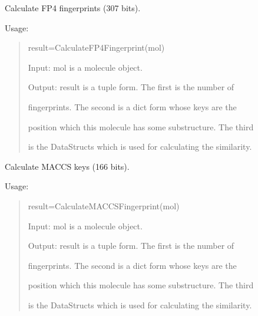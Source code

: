 \documentclass[letterpaper,10pt,english]{sphinxmanual}
\begin{document}
\begin{fulllineitems}
\label{reference/fingerprint:fingerprint.CalculateFP4Fingerprint}
Calculate FP4 fingerprints (307 bits).

Usage:
\begin{quote}

result=CalculateFP4Fingerprint(mol)

Input: mol is a molecule object.

Output: result is a tuple form. The first is the number of

fingerprints. The second is a dict form whose keys are the

position which this molecule has some substructure. The third

is the DataStructs which is used for calculating the similarity.
\end{quote}

\end{fulllineitems}


\begin{fulllineitems}
\label{reference/fingerprint:fingerprint.CalculateGhoseCrippenFingerprint}
\end{fulllineitems}


\begin{fulllineitems}
\label{reference/fingerprint:fingerprint.CalculateMACCSFingerprint}
Calculate MACCS keys (166 bits).

Usage:
\begin{quote}

result=CalculateMACCSFingerprint(mol)

Input: mol is a molecule object.

Output: result is a tuple form. The first is the number of

fingerprints. The second is a dict form whose keys are the

position which this molecule has some substructure. The third

is the DataStructs which is used for calculating the similarity.
\end{quote}

\end{fulllineitems}
\end{document}
